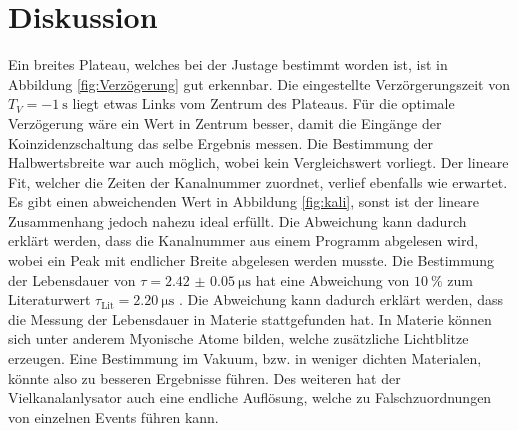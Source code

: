 \section{Diskussion}
Ein breites Plateau, welches bei der Justage bestimmt worden ist, ist in Abbildung \ref{fig:Verzögerung} gut erkennbar. Die eingestellte Verzörgerungszeit von $T_V = \SI{-1}{\second}$ liegt etwas Links vom Zentrum des Plateaus.
Für die optimale Verzögerung wäre ein Wert in Zentrum besser, damit die Eingänge der Koinzidenzschaltung das selbe Ergebnis messen. Die Bestimmung der Halbwertsbreite war auch möglich, wobei kein Vergleichswert vorliegt.
Der lineare Fit, welcher die Zeiten der Kanalnummer zuordnet, verlief ebenfalls wie erwartet. Es gibt einen 
abweichenden Wert in Abbildung \ref{fig:kali}, sonst ist der lineare Zusammenhang jedoch nahezu ideal erfüllt. 
Die Abweichung kann dadurch erklärt werden, dass die Kanalnummer aus einem Programm abgelesen 
wird, wobei ein Peak mit endlicher Breite abgelesen werden musste. 
Die Bestimmung der Lebensdauer von $\tau = \SI{2.42(5)}{\micro\second}$ hat eine Abweichung von $\SI{10}{\percent}$ zum 
Literaturwert $\tau_{\text{Lit}} = \SI{2.20}{\micro\second}$ \cite{PDG}. Die Abweichung kann 
dadurch erklärt werden, dass die Messung der Lebensdauer in Materie stattgefunden hat. In Materie können 
sich unter anderem Myonische Atome bilden, welche zusätzliche Lichtblitze erzeugen.
Eine Bestimmung im Vakuum, bzw. in weniger dichten Materialen, könnte also zu besseren Ergebnisse 
führen. Des weiteren hat der Vielkanalanlysator auch eine endliche Auflösung, welche zu Falschzuordnungen von einzelnen Events führen kann.

